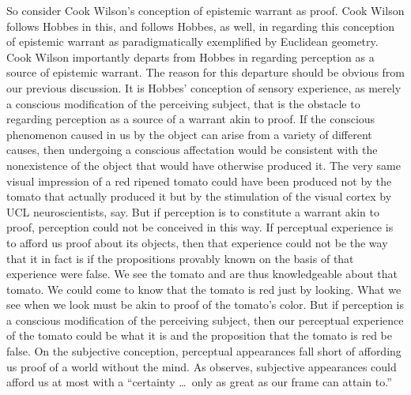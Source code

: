 \documentclass[12pt]{article}
\begin{document}
So consider Cook Wilson's conception of epistemic warrant as proof. Cook Wilson follows Hobbes in this, and follows Hobbes, as well, in regarding this conception of epistemic warrant as paradigmatically exemplified by Euclidean geometry. Cook Wilson importantly departs from Hobbes in regarding perception as a source of epistemic warrant. The reason for this departure should be obvious from our previous discussion. It is Hobbes' conception of sensory experience, as merely a conscious modification of the perceiving subject, that is the obstacle to regarding perception as a source of a warrant akin to proof. If the conscious phenomenon caused in us by the object can arise from a variety of different causes, then undergoing a conscious affectation would be consistent with the nonexistence of the object that would have otherwise produced it. The very same visual impression of a red ripened tomato could have been produced not by the tomato that actually produced it but by the stimulation of the visual cortex by UCL neuroscientists, say. But if perception is to constitute a warrant akin to proof, perception could not be conceived in this way. If perceptual experience is to afford us proof about its objects, then that experience could not be the way that it in fact is if the propositions provably known on the basis of that experience were false. We see the tomato and are thus knowledgeable about that tomato. We could come to know that the tomato is red just by looking. What we see when we look must be akin to proof of the tomato's color. But if perception is a conscious modification of the perceiving subject, then our perceptual experience of the tomato could be what it is and the proposition that the tomato is red be false. On the subjective conception, perceptual appearances fall short of affording us proof of a world without the mind. As \citet{Locke:1706hc} observes, subjective appearances could afford us at most with a ``certainty \ldots\ only as great as our frame can attain to.''

\end{document}
